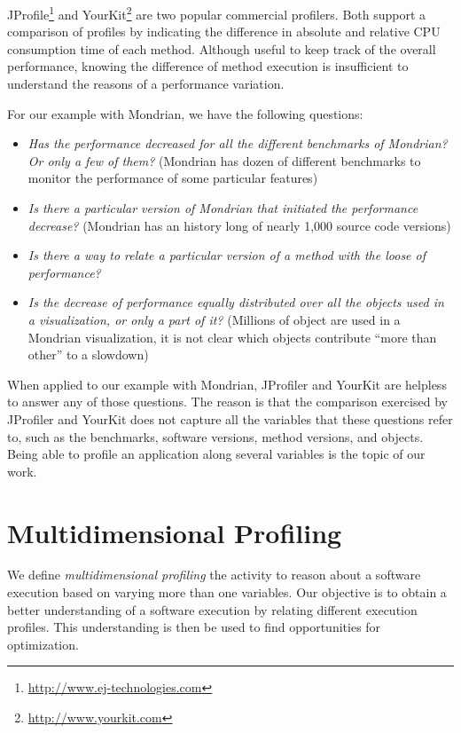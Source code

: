 \documentclass{sig-alternate}
\begin{document}
JProfile\footnote{\url{http://www.ej-technologies.com}} and YourKit\footnote{\url{http://www.yourkit.com}} are two popular commercial profilers. Both support a comparison of profiles by indicating the difference in absolute and relative CPU consumption time of each method. Although useful to keep track of the overall performance, knowing the difference of method execution is insufficient to understand the reasons of a performance variation. 

For our example with Mondrian, we have the following questions:
\begin{itemize}
\item \emph{Has the performance decreased for all the different benchmarks of Mondrian? Or only a few of them?} (Mondrian has dozen of different benchmarks to monitor the performance of some particular features)
\item \emph{Is there a particular version of Mondrian that initiated the performance decrease?} (Mondrian has an history long of nearly 1,000 source code versions)
\item \emph{Is there a way to relate a particular version of a method with the loose of performance?} 
\item \emph{Is the decrease of performance equally distributed over all the objects used in a visualization, or only a part of it?} (Millions of object are used in a Mondrian visualization, it is not clear which objects contribute ``more than other'' to a slowdown)
\end{itemize}

When applied to our example with Mondrian, JProfiler and YourKit are helpless to answer any of those questions. The reason is that the comparison exercised by JProfiler and YourKit does not capture all the variables that these questions refer to, such as the benchmarks, software versions, method versions, and objects. Being able to profile an application along several variables is the topic of our work.

\section{Multidimensional Profiling}

We define \emph{multidimensional profiling} the activity to reason about a software execution based on varying more than one variables. Our objective is to obtain a better understanding of a software execution by relating different execution profiles. This understanding is then be used to find opportunities for optimization.
\end{document}
